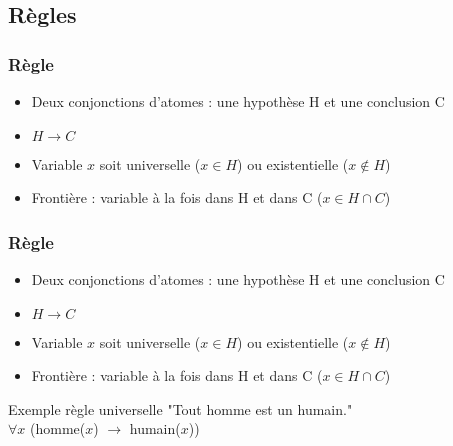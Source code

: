 
\subsection{Règles}
\begin{frame}[t]
	\frametitle{Règle}
	\begin{center}
	\begin{itemize}
		\item Deux conjonctions d'atomes : une hypothèse H et une conclusion C
		\item $H \rightarrow C$
		\item Variable $x$ soit universelle ($x \in H$) ou existentielle ($x \notin H$)
		\item Frontière : variable à la fois dans H et dans C ($x \in H \cap C$)\\
	\end{itemize}
	\end{center}
\end{frame}

\begin{frame}[t]
	\frametitle{Règle}
	\begin{center}
	\begin{itemize}
		\item Deux conjonctions d'atomes : une hypothèse H et une conclusion C
		\item $H \rightarrow C$
		\item Variable $x$ soit universelle ($x \in H$) ou existentielle ($x \notin H$)
		\item Frontière : variable à la fois dans H et dans C ($x \in H \cap C$)\\
	\end{itemize}

	\begin{exampleblock}{Exemple règle universelle}
		"Tout homme est un humain."\\
		$\forall x$ (homme($x$) $\rightarrow$ humain($x$))
	\end{exampleblock}

	\end{center}
\end{frame}

